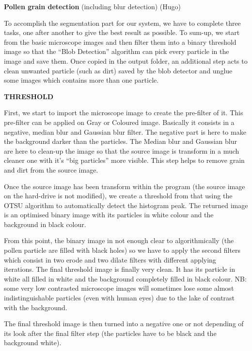 \textbf{Pollen grain detection} (including blur detection) (Hugo)

To accomplish the segmentation part for our system, we have to complete three tasks, one after another to give the best result as possible.
	To sum-up, we start from the basic microscope images and then filter them into a binary threshold image so that the “Blob Detection” algorithm can pick every particle in the image and save them. Once copied in the output folder, an additional step acts to clean unwanted particle (such as dirt) saved by the blob detector and unglue some images which contains more than one particle.

\textbf{THRESHOLD}

	First, we start to import the microscope image to create the pre-filter of it. This pre-filter can be applied on Gray or Coloured image. Basically it consists in a negative, median blur and Gaussian blur filter. The negative part is here to make the background darker than the particles. The Median blur and Gaussian blur are here to clean-up the image so that the source image is transform in a much cleaner one with it's “big particles” more visible. This step helps to remove grain and dirt from the source image.
	
	Once the source image has been transform within the program (the source image on the hard-drive is not modified), we create a threshold from that using the OTSU algorithm to automatically detect the histogram peak. The returned image is an optimised binary image with its particles in white colour and the background in black colour.
	
	From this point, the binary image in not enough clear to algorithmically (the pollen particle are filled with black holes) so we have to apply the second filters which consist in two erode and two dilate filters with different applying iterations. The final threshold image is finally very clean. It has its particle in white all filled in white and the background completely filled in black colour. NB: some very low contrasted microscope images will sometimes lose some almost indistinguishable particles (even with human eyes) due to the lake of contrast with the background.
	
	The final threshold image is then turned into a negative one or not depending of its look after the final filter step (the particles have to be black and the background white).
    
    
    